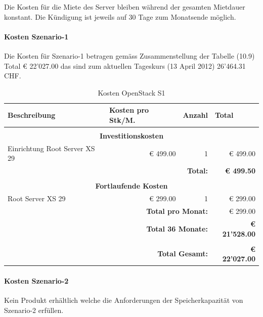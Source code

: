 Die Kosten für die Miete des Server bleiben während der gesamten Mietdauer konstant. Die Kündigung ist jeweils auf 30 Tage zum Monatsende möglich. 

\paragraph*{Kosten Szenario-1}
Die Kosten für Szenario-1 betragen gemäss Zusammenstellung der Tabelle (10.9) Total € 22'027.00 das sind zum aktuellen Tageskurs (13 April 2012) 26'464.31 CHF.

\begin{table}[htbp]
\caption{Kosten OpenStack S1}
\begin{small}
\begin{tabular}{|l|r|r|r|}
\hline
\textbf{Beschreibung} & \multicolumn{1}{l|}{\textbf{Kosten pro Stk/M.}} & \multicolumn{1}{l|}{\textbf{Anzahl}} & \multicolumn{1}{l|}{\textbf{Total}} \\ \hline
  \multicolumn{ 4}{c}{} \\  \hline
\multicolumn{ 4}{|c|}{\textbf{Investitionskosten}} \\ \hline
Einrichtung Root Server XS 29 & € 499.00 & 1 & € 499.00 \\ \hline \hline
  \multicolumn{ 3}{r|}{\textbf{Total:}}  & \textbf{€ 499.50} \\ 
  \cline{4-4}
\multicolumn{ 4}{c}{} \\   \hline
\multicolumn{ 4}{|c|}{\textbf{Fortlaufende Kosten}} \\ \hline
Root Server XS 29  & € 299.00 & 1 & € 299.00 \\ \hline \hline
  \multicolumn{ 3}{r|}{\textbf{Total pro Monat:}} & € 299.00 \\
\cline{4-4}
  \multicolumn{ 3}{r|}{\textbf{Total 36 Monate:}} & \textbf{€ 21'528.00} \\ \cline{4-4}
  \multicolumn{ 4}{c}{} \\  \cline{4-4}
  \multicolumn{ 3}{r|}{\textbf{Total Gesamt:}} & \textbf{€ 22'027.00} \\ \cline{4-4}
\end{tabular}
\end{small}
\label{KostenOpenStackS1}
\end{table}


\paragraph*{Kosten Szenario-2}
Kein Produkt erhältlich welche die Anforderungen der Speicherkapazität von Szenario-2 erfüllen.


